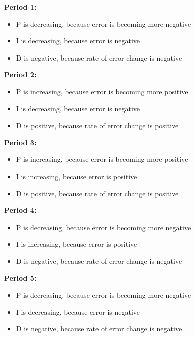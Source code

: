 






{\bf Period 1:}
 

\begin{itemize}
\item{}P is decreasing, because error is becoming more negative
\item{}I is decreasing, because error is negative
\item{}D is negative, because rate of error change is negative
\end{itemize} 
\bigskip 
 

{\bf Period 2:}
 

\begin{itemize}
\item{}P is increasing, because error is becoming more positive
\item{}I is decreasing, because error is negative
\item{}D is positive, because rate of error change is positive
\end{itemize} 
\bigskip 
 

{\bf Period 3:}
 

\begin{itemize}
\item{}P is increasing, because error is becoming more positive
\item{}I is increasing, because error is positive
\item{}D is positive, because rate of error change is positive
\end{itemize} 
\bigskip 
 

{\bf Period 4:}
 

\begin{itemize}
\item{}P is decreasing, because error is becoming more negative
\item{}I is increasing, because error is positive
\item{}D is negative, because rate of error change is negative
\end{itemize} 
\bigskip 
 

{\bf Period 5:}
 

\begin{itemize}
\item{}P is decreasing, because error is becoming more negative
\item{}I is decreasing, because error is negative
\item{}D is negative, because rate of error change is negative
\end{itemize} 
\bigskip 
 

